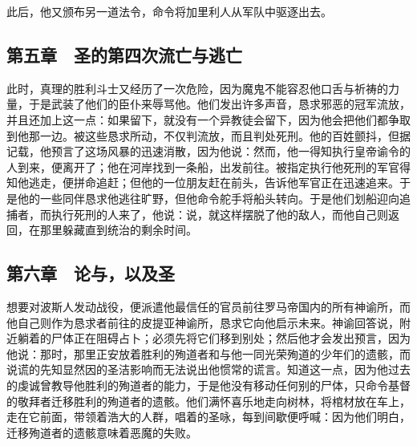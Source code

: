 此后，他又颁布另一道法令，命令将加里利人从军队中驱逐出去。\par


\subsection{第五章　圣的第四次流亡与逃亡}

此时，真理的胜利斗士又经历了一次危险，因为魔鬼不能容忍他口舌与祈祷的力量，于是武装了他们的臣仆来辱骂他。他们发出许多声音，恳求邪恶的冠军流放，并且还加上这一点：如果留下，就没有一个异教徒会留下，因为他会把他们都争取到他那一边。被这些恳求所动，不仅判流放，而且判处死刑。他的百姓颤抖，但据记载，他预言了这场风暴的迅速消散，因为他说：然而，他一得知执行皇帝谕令的人到来，便离开了；他在河岸找到一条船，出发前往。被指定执行他死刑的军官得知他逃走，便拼命追赶；但他的一位朋友赶在前头，告诉他军官正在迅速追来。于是他的一些同伴恳求他逃往旷野，但他命令舵手将船头转向。于是他们划船迎向追捕者，而执行死刑的人来了，他说：说，就这样摆脱了他的敌人，而他自己则返回，在那里躲藏直到统治的剩余时间。\par


\subsection{第六章　论与，以及圣}

想要对波斯人发动战役，便派遣他最信任的官员前往罗马帝国内的所有神谕所，而他自己则作为恳求者前往的皮提亚神谕所，恳求它向他启示未来。神谕回答说，附近躺着的尸体正在阻碍占卜；必须先将它们移到别处；然后他才会发出预言，因为他说：那时，那里正安放着胜利的殉道者和与他一同光荣殉道的少年们的遗骸，而说谎的先知显然因的圣洁影响而无法说出他惯常的谎言。知道这一点，因为他过去的虔诚曾教导他胜利的殉道者的能力，于是他没有移动任何别的尸体，只命令基督的敬拜者迁移胜利的殉道者的遗骸。他们满怀喜乐地走向树林，将棺材放在车上，走在它前面，带领着浩大的人群，唱着的圣咏，每到间歇便呼喊：因为他们明白，迁移殉道者的遗骸意味着恶魔的失败。\par

